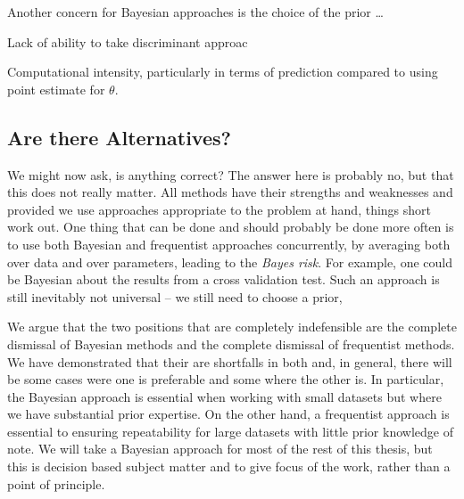 Another concern for Bayesian approaches is the choice of the prior \dots {}

Lack of ability to take discriminant approac

Computational intensity, particularly in terms of prediction compared to using point estimate for $\theta$.

\subsection{Are there Alternatives?}
\label{sec:bayes:religion:correct}


We might now ask, is anything correct?  The answer here is probably no, but that this does not really matter.  All methods
have their strengths and weaknesses and provided we use approaches appropriate to the problem at hand, things short work out.
One thing that can be done and should probably be done more often is to use both Bayesian and frequentist approaches concurrently,
by averaging both over data and over parameters, leading to the \emph{Bayes risk}.   For example, one could be Bayesian 
about the results from a cross validation test.  Such an approach is still inevitably not universal -- we still need to choose
a prior, 

We argue that the two positions that are completely indefensible are the complete dismissal of Bayesian
methods and the complete dismissal of frequentist methods.  We have demonstrated that their are shortfalls
in both and, in general, there will be some cases were one is preferable and some where the other is.  In
particular, the Bayesian approach is essential when working with small datasets but where we have substantial
prior expertise.  On the other hand, a frequentist approach is essential to ensuring repeatability for large
datasets with little prior knowledge of note.  
We will take a Bayesian approach for most of the rest of this thesis, but this is decision based subject matter and
to give focus of the work, rather than a point of principle.

